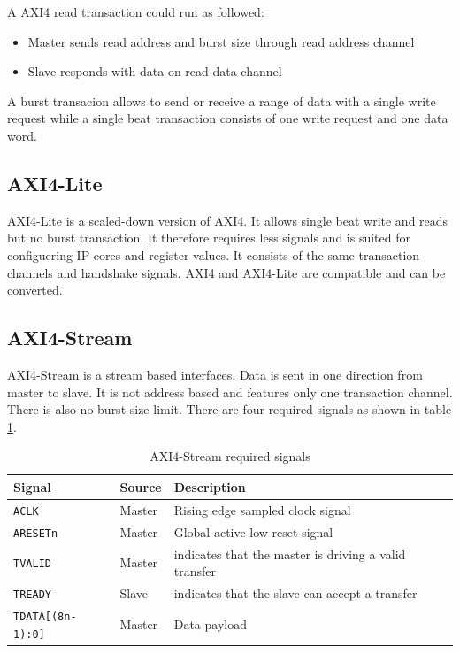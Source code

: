 A AXI4 read transaction could run as followed:
\begin{itemize}
    \item Master sends read address and burst size through read address channel
    \item Slave responds with data on read data channel
\end{itemize}

A burst transacion allows to send or receive a range of data with a single write
request while a single beat transaction consists of one write request and one
data word.

\subsection{AXI4-Lite}
AXI4-Lite is a scaled-down version of AXI4. It allows single beat write and
reads but no burst transaction. It therefore requires less signals and is suited
for configuering IP cores and register values. It consists of the same
transaction channels and handshake signals. AXI4 and AXI4-Lite are compatible
and can be converted.

\subsection{AXI4-Stream}
AXI4-Stream is a stream based interfaces. Data is sent in one direction from
master to slave. It is not address based and features only one transaction
channel. There is also no burst size limit. There are four required signals as
shown in table \ref{tab:axi4steramreqsig}.

\begin{table}[h]
    \centering
    \begin{tabular}{ l  l l}
        \toprule
        Signal & Source & Description \\
        \midrule
        \texttt{ACLK} & Master & Rising edge sampled clock signal \\
        \texttt{ARESETn} & Master & Global active low reset signal \\
        \texttt{TVALID} & Master & indicates that the master is driving a valid transfer
        \\
        \texttt{TREADY} & Slave & indicates that the slave can accept a transfer \\
        \texttt{TDATA[(8n-1):0]} & Master & Data payload \\
        \bottomrule
    \end{tabular}
    \caption{AXI4-Stream required signals}
    \label{tab:axi4steramreqsig}
\end{table}

